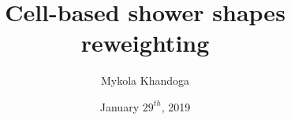 \documentclass{beamer}
\title[Shower shapes reweighting]{Cell-based shower shapes reweighting} %
\author{Mykola Khandoga}
\institute[CEA Saclay] 
{CEA Saclay \\ %
\medskip ATLAS $e/\gamma$ workshop, Sheffield
   
}
\date{January $29^{th}$, 2019} %
\begin{document}
\begin{frame}
\titlepage %
\end{frame}



\end{document}
